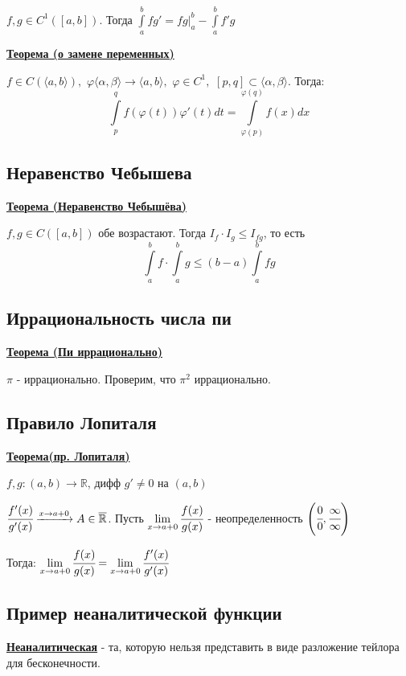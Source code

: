 \documentclass{article}
\newcommand{\integral}[2]{\displaystyle\int\limits_{#1}^{#2}}
\newcommand{\deff}[1]{\underline{\textbf{#1}}}
\newcommand{\thmm}[1]{\underline{\textbf{#1}}}
\begin{document}
 $f,g \in C^1([a,b])$. Тогда $\integral{a}{b}fg' = fg\big|_a^b-\integral{a}{b}f'g$

\thmm{Теорема (о замене переменных)}

$f \in C(\langle a,b\rangle), \,\, \varphi\langle\alpha, \beta\rangle \rightarrow \langle a, b \rangle, \,\, \varphi \in C^1, \,\, [p,q] \subset \langle \alpha,\beta\rangle$. Тогда:
$$\integral{p}{q}f(\varphi(t))\varphi'(t)dt = \integral{\varphi(p)}{\varphi(q)}f(x)dx$$

\subsection{Неравенство Чебышева}

 \thmm{Теорема (Неравенство Чебышёва)}

 $f,g \in C([a,b])$ обе возрастают. Тогда $I_f \cdot I_g \leq I_{fg}$, то есть
$$\integral{a}{b}f \cdot \integral{a}{b}g\leq (b-a)\integral{a}{b}fg$$

\subsection{Иррациональность числа пи}

\thmm{Теорема (Пи иррационально)}

$\pi$ - иррационально. Проверим, что $\pi^2$ иррационально. 


\subsection{Правило Лопиталя}

\thmm{Теорема(пр. Лопиталя)}

$f,g: (a,b) \rightarrow\mathbb{R}$, дифф $g'\neq 0$ на $(a,b)$

$\cfrac{f'(x)}{g'(x)} \xrightarrow{x \rightarrow a+0} A \in \overline{\mathbb{R}}$. Пусть $\lim\limits_{x\rightarrow a+0}\cfrac{f(x)}{g(x)}$ - неопределенность $\left(\cfrac{0}{0}, \cfrac{\infty}{\infty}\right)$

Тогда: $\lim\limits_{x\rightarrow a+0}\cfrac{f(x)}{g(x)}=\lim\limits_{x\rightarrow a+0} \cfrac{f'(x)}{g'(x)}$

\subsection{Пример неаналитической функции}

\deff{Неаналитическая} - та, которую нельзя представить в виде разложение тейлора для бесконечности.
\end{document}
